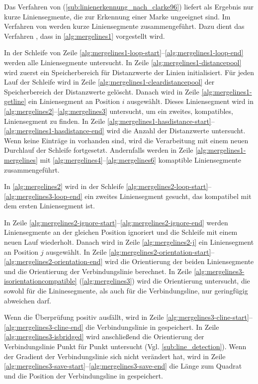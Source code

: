 
Das Verfahren von \citeauthor{clarke96} (\autoref{sub:linienerkennung_nach_clarke96}) liefert als Ergebnis nur kurze
 Liniensegmente, die zur Erkennung einer Marke ungeeignet sind. Im Verfahren von \citeauthor{hirzer08} werden kurze
 Liniensegmente zusammengeführt. Dazu dient das Verfahren , dass in \autoref{alg:mergelines1}
 vorgestellt wird.

In der Schleife von Zeile \ref{alg:mergelines1-loop-start}--\ref{alg:mergelines1-loop-end} werden alle Liniensegmente
 untersucht. In Zeile \ref{alg:mergelines1-distancepool} wird zuerst ein Speicherbereich für Distanzwerte der Linien
 initialisiert. Für jeden Lauf der Schleife wird in Zeile \ref{alg:mergelines1-cleardistancepool} der Speicherbereich
 der Distanzwerte gelöscht. Danach wird in Zeile \ref{alg:mergelines1-getline} ein Liniensegment an Position $i$
 ausgewählt. Dieses Liniensegment wird in \autoref{alg:mergelines2}--\autoref{alg:mergelines3} untersucht, um ein
 zweites, kompatibles, Liniensegment zu finden. In Zeile
 \ref{alg:mergelines1-hasdistance-start}--\ref{alg:mergelines1-hasdistance-end} wird die Anzahl der Distanzwerte
 untersucht. Wenn keine Einträge in  vorhanden sind, wird die Verarbeitung mit einem neuen
 Durchlauf der Schleife fortgesetzt. Andernfalls werden in Zeile \ref{alg:mergelines1-mergelines} mit
 \autoref{alg:mergelines4}--\autoref{alg:mergelines6} komaptible Liniensegmente zusammengeführt.

In \autoref{alg:mergelines2} wird in der Schleife \ref{alg:mergelines2-loop-start}--\ref{alg:mergelines3-loop-end} ein
 zweites Liniensegment gesucht, das kompatibel mit dem ersten Liniensegment ist.

In Zeile \ref{alg:mergelines2-ignore-start}--\ref{alg:mergelines2-ignore-end} werden Liniensegmente an der gleichen
 Position ignoriert und die Schleife mit einem neuen Lauf wiederholt. Danach wird in Zeile \ref{alg:mergelines2-j} ein
 Liniensegment an Position $j$ ausgewählt. In Zeile
 \ref{alg:mergelines2-orientation-start}--\ref{alg:mergelines2-orientation-end} wird die Orientierung der beiden
 Liniensegmente und die Orientierung der Verbindungslinie berechnet. In Zeile
 \ref{alg:mergelines3-isorientationcompatible} (\autoref{alg:mergelines3}) wird die Orientierung untersucht,
 die sowohl für die Lininesegmente, als auch für die Verbindungsline, nur geringfügig abweichen darf.

Wenn die Überprüfung positiv ausfällt, wird in Zeile \ref{alg:mergelines3-cline-start}--\ref{alg:mergelines3-cline-end}
 die Verbindungslinie in  gespeichert. In Zeile \ref{alg:mergelines3-isbridged} wird anschließend die
 Orientierung der Verbindungslinie Punkt für Punkt untersucht (Vgl. \autoref{sub:line_detection}). Wenn der Gradient
 der Verbindungslinie sich nicht verändert hat, wird in Zeile
 \ref{alg:mergelines3-save-start}--\ref{alg:mergelines3-save-end} die Länge zum Quadrat und die Position der
 Verbindungsline in  gespeichert.

